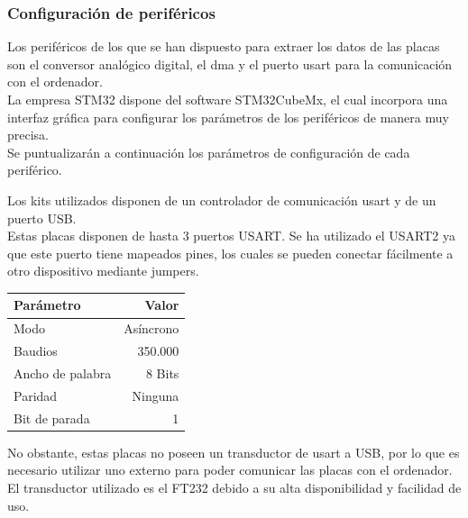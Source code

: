 \documentclass[spanish]{template/minim}
\newcommand{\dataelem}[1]{
    \noindent\textit{{\color{accent}{#1}}}
}
\begin{document}
\subsubsection{Configuración de periféricos}\label{sec:config_boards}

Los periféricos de los que se han dispuesto para extraer los datos de las placas son el conversor analógico digital, el \gls{dma} y el puerto \gls{usart} para la comunicación con el ordenador.\\

La empresa STM32 dispone del software STM32CubeMx, el cual incorpora una interfaz gráfica para configurar los parámetros de los periféricos de manera muy precisa.\\

Se puntualizarán a continuación los parámetros de configuración de cada periférico.\\

\dataelem{Puerto USART}

Los kits utilizados disponen de un controlador de comunicación \gls{usart} y de un puerto USB.\\

Estas placas disponen de hasta 3 puertos USART. Se ha utilizado el USART2 ya que este puerto tiene mapeados pines, los cuales se pueden conectar fácilmente a otro dispositivo mediante jumpers.\\

\begin{table}[h]
    \centering


    \begin{tabular}{p{4cm}r}
        \toprule
        Parámetro & Valor \\
        \midrule
        Modo & Asíncrono \\
        Baudios & 350.000\\
        Ancho de palabra & 8 Bits\\
        Paridad & Ninguna\\
        Bit de parada & 1\\
        \bottomrule
    \end{tabular}

\end{table}

No obstante, estas placas no poseen un transductor de \gls{usart} a USB, por lo que es necesario utilizar uno externo para poder comunicar las placas con el ordenador. El transductor utilizado es el {\color{Red}FT232} debido a su alta disponibilidad y facilidad de uso.\\
\end{document}
